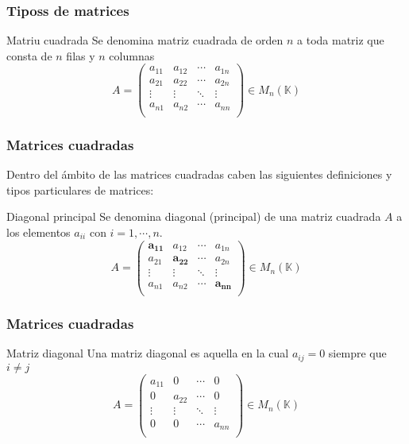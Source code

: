 \documentclass[12pt]{article}
\begin{document}
 \begin{frame}
  \frametitle{Tiposs de matrices}
  \begin{block}{Matriu cuadrada}
Se denomina matriz cuadrada de orden $n$ a toda matriz que consta de $n$ filas y $n$ columnas
\[ A =  \left(\begin{matrix} %
      a_{11} & a_{12} & \cdots & a_{1n} \\
 a_{21} & a_{22} & \cdots & a_{2n} \\
  \vdots & \vdots & \ddots & \vdots \\
   a_{n1} & a_{n2} & \cdots & a_{nn} \\
    \end{matrix}\right) \in M_{ n} (\mathbb{K})\]
  \end{block}

  

 \end{frame}
 
 
  \begin{frame}
  \frametitle{Matrices cuadradas}
  
 Dentro del \'ambito de las matrices cuadradas caben las siguientes definiciones y tipos particulares de matrices:


  \begin{block}{Diagonal principal}
Se denomina diagonal (principal) de una matriz cuadrada $A$ a los elementos $a_{ii}$ con $i=1,\cdots, n$.
\[ A =  \left(\begin{matrix} %
      \boldsymbol{a_{11}} & a_{12} & \cdots & a_{1n} \\
 a_{21} & \boldsymbol{a_{22}} & \cdots & a_{2n} \\
  \vdots & \vdots & \ddots & \vdots \\
   a_{n1} & a_{n2} & \cdots & \boldsymbol{a_{nn}} \\
    \end{matrix}\right) \in M_{ n} (\mathbb{K})\]
  \end{block}

 \end{frame}
 
   \begin{frame}
  \frametitle{Matrices cuadradas}
  

   \begin{block}{Matriz diagonal}
Una matriz diagonal es aquella en la cual $a_{ij} = 0$ siempre que $i\neq j $
\[ A =  \left(\begin{matrix} %
      a_{11} & 0 & \cdots & 0 \\
      0 & a_{22} & \cdots & 0 \\
  \vdots & \vdots & \ddots & \vdots \\
   0 & 0 & \cdots & a_{nn} \\
    \end{matrix}\right) \in M_{ n} (\mathbb{K})\]
  \end{block}

 \end{frame}
 
\end{document}
